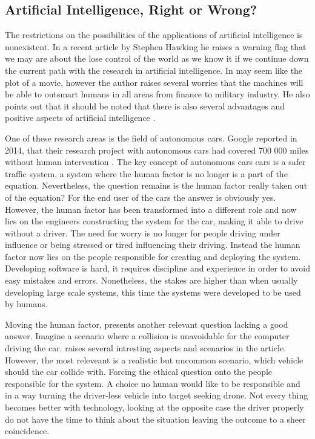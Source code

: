 \subsection{Artificial Intelligence, Right or Wrong? }
\label{sec:hawkins}
The restrictions on the possibilities of the applications of artificial intelligence is nonexistent. In a recent article by Stephen Hawking he raises a warning flag that we may are about the lose control of the world as we know it if we continue down the current path with the research in artificial intelligence. In may seem like the plot of a movie, however the author raises several worries that the machines will be able to outsmart humans in all areas from finance to military industry. He also points out that it should be noted that there is also several advantages and positive aspects of artificial intelligence \parencite{Hawking:Online}. 

One of these research areas is the field of autonomous cars. Google reported in 2014, that their research project with autonomous cars had covered 700 000 miles without human intervention \parencite{Urmson2014:Online}. The key concept of autonomous cars cars is a safer traffic system, a system where the human factor is no longer is a part of the equation. Nevertheless, the question remains is the human factor really taken out of the equation? For the end user of the cars the answer is obviously yes. However, the human factor has been transformed into a different role and now lies on the engineers constructing the system for the car, making it able to drive without a driver. The need for worry is no longer for people driving under influence or being stressed or tired influencing their driving. Instead the human factor now lies on the people responsible for creating and deploying the system. Developing software is hard, it requires discipline and experience in order to avoid easy mistakes and errors. Nonetheless, the stakes are higher than when usually developing large scale systems, this time the systems were developed to be used by humans. 

Moving the human factor, presents another relevant question lacking a good answer. Imagine a scenario where a collision is unavoidable for the computer driving the car. \textcite{Lin:Online} raises several intresting aspects and scenarios in the article. However, the most releveant is a realistic but uncommon scenario, which vehicle should the car collide with. Forcing the ethical question onto the people responsible for the system. A choice no human would like to be responsible and in a way turning the driver-less vehicle into target seeking drone. Not every thing becomes better with technology, looking at the opposite case the driver properly do not have the time to think about the situation leaving the outcome to a sheer coincidence.
